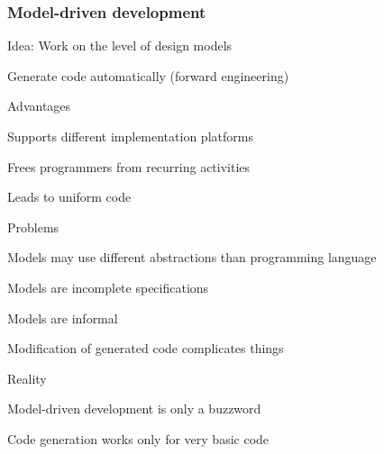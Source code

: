 \subsubsection{Model-driven development}
\enumstart
	\item Idea: Work on the level of design models
	\item Generate code automatically (forward engineering)
	\item Advantages
	\enumstart
		\item Supports different implementation platforms
		\item Frees programmers from recurring activities
		\item Leads to uniform code
	\enumend
	\item Problems
	\enumstart
		\item Models may use different abstractions than programming language
		\item Models are incomplete specifications
		\item Models are informal
		\item Modification of generated code complicates things
	\enumend
	\item Reality
	\enumstart
		\item Model-driven development is only a buzzword
		\item Code generation works only for very basic code
	\enumend
\enumend
